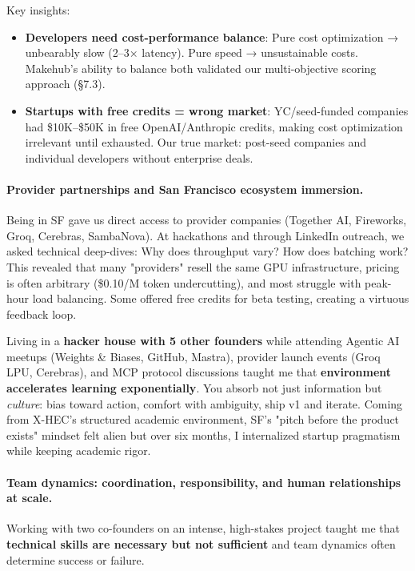 \documentclass[english]{article}
\begin{document}
Key insights:
\begin{itemize}
    \item \textbf{Developers need cost-performance balance}: Pure cost optimization → unbearably slow (2--3× latency). Pure speed → unsustainable costs. Makehub's ability to balance both validated our multi-objective scoring approach (§7.3).

    \item \textbf{Startups with free credits = wrong market}: YC/seed-funded companies had \$10K--\$50K in free OpenAI/Anthropic credits, making cost optimization irrelevant until exhausted. Our true market: post-seed companies and individual developers without enterprise deals.
\end{itemize}

\paragraph{Provider partnerships and San Francisco ecosystem immersion.}

Being in SF gave us direct access to provider companies (Together AI, Fireworks, Groq, Cerebras, SambaNova). At hackathons and through LinkedIn outreach, we asked technical deep-dives: Why does throughput vary? How does batching work? This revealed that many "providers" resell the same GPU infrastructure, pricing is often arbitrary (\$0.10/M token undercutting), and most struggle with peak-hour load balancing. Some offered free credits for beta testing, creating a virtuous feedback loop.

Living in a \textbf{hacker house with 5 other founders} while attending Agentic AI meetups (Weights \& Biases, GitHub, Mastra), provider launch events (Groq LPU, Cerebras), and MCP protocol discussions taught me that \textbf{environment accelerates learning exponentially}. You absorb not just information but \emph{culture}: bias toward action, comfort with ambiguity, ship v1 and iterate. Coming from X-HEC's structured academic environment, SF's "pitch before the product exists" mindset felt alien but over six months, I internalized startup pragmatism while keeping academic rigor.


\paragraph{Team dynamics: coordination, responsibility, and human relationships at scale.}

Working with two co-founders on an intense, high-stakes project taught me that \textbf{technical skills are necessary but not sufficient} and team dynamics often determine success or failure.
\end{document}
